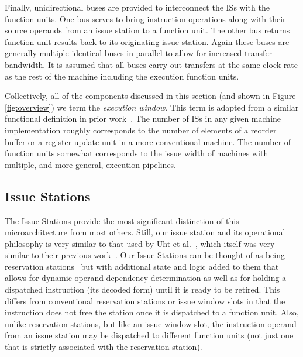 \documentclass[10pt,dvips]{article}
\begin{document}
Finally, unidirectional buses are provided to interconnect
the ISs with the function units.
One bus serves to bring instruction
operations along with their source operands from an issue
station to a function unit.
The other bus returns function unit results back to its
originating issue station.
Again these buses are generally multiple identical buses in
parallel to allow for increased transfer bandwidth.
It is assumed that all buses carry out transfers at the same
clock rate as the rest of the machine including the execution
function units.

Collectively, all of the components discussed in this section
(and shown in 
Figure \ref{fig:overview}) we term the \textit{execution window}.
This term is adapted from a similar functional definition in prior
work~\cite{uht02realizing}.
The number of ISs in
any given machine implementation roughly corresponds to the
number of elements of a reorder buffer or a register update unit
in a more conventional machine.
The number of function units somewhat corresponds to the
issue width of machines with multiple, and more general, execution pipelines.
%
\subsection{Issue Stations}
%
The Issue Stations provide the most significant distinction of this
microarchitecture from most others.
Still, our issue station and its operational philosophy
is very similar to that used by 
Uht et al.~\cite{uht03levo}, which itself was very similar to
their previous work~\cite{uht02realizing}.
Our Issue Stations can be thought of as being 
reservation stations~\cite{Tom67} but
with additional state and logic added to them that allows
for dynamic operand dependency determination as well as
for holding a dispatched instruction (its decoded form) 
until it is ready to be
retired.  This differs from conventional reservation stations
or issue window slots in that the instruction does not free
the station once it is dispatched to a function unit.
Also, unlike reservation stations, but like an issue window slot,
the instruction operand from an issue station may be dispatched
to different function units (not just one that is strictly
associated with the reservation station).
\end{document}
